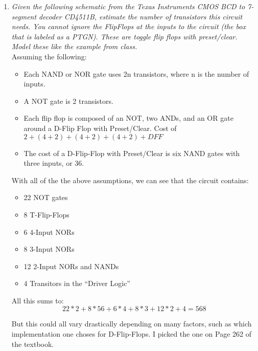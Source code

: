 \documentclass[12pt]{article}
\begin{document}
\begin{enumerate}
\begin{enumerate}
  \end{enumerate}

  \newpage
  \item \textit{Given the following schematic from the Texas Instruments CMOS BCD to 7-segment decoder CD4511B, estimate the number of transistors this circuit needs. You cannot ignore the FlipFlops at the inputs to the circuit (the box that is labeled as a PTGN). These are toggle flip flops with preset/clear. Model these like the example from class.}\\
  Assuming the following:
  \begin{itemize}
    \item{Each NAND or NOR gate uses 2n transistors, where n is the number of inputs.}
    \item{A NOT gate is 2 transistors.}
    \item{Each flip flop is composed of an NOT, two ANDs, and an OR gate around a D-Flip Flop with Preset/Clear. Cost of $2+(4+2)+(4+2)+(4+2)+DFF$}
    \item{The cost of a D-Flip-Flop with Preset/Clear is six NAND gates with three inputs, or 36.}
  \end{itemize}

  With all of the the above assumptions, we can see that the circuit contains:

  \begin{itemize}
    \item{22 NOT gates}
    \item{8 T-Flip-Flops}
    \item{6 4-Input NORs}
    \item{8 3-Input NORs}
    \item{12 2-Input NORs and NANDs}
    \item{4 Transitors in the ``Driver Logic''}
  \end{itemize}

  All this sums to:
  \[
    22*2 + 8*56 + 6*4 + 8*3 + 12*2 + 4 = \boxed{568}
  \]

  But this could all vary drastically depending on many factors, such as which implementation one choses for D-Flip-Flops. I picked the one on Page 262 of the textbook.



\end{enumerate}
\end{document}
